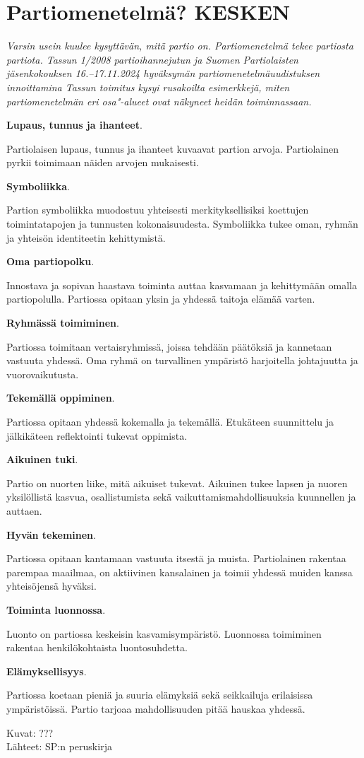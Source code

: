 \section{Partiomenetelmä? KESKEN}

\textit{Varsin usein kuulee kysyttävän, mitä partio on. Partiomenetelmä tekee partiosta partiota. Tassun 1/2008 partioihannejutun ja Suomen Partiolaisten jäsenkokouksen 16.--17.11.2024 hyväksymän partiomenetelmäuudistuksen innoittamina Tassun toimitus kysyi rusakoilta esimerkkejä, miten partiomenetelmän eri osa"-alueet ovat näkyneet heidän toiminnassaan.}

\begin{multicols}{2}
\noindent\textbf{Lupaus, tunnus ja ihanteet}. {\small Partiolaisen lupaus, tunnus ja ihanteet kuvaavat partion arvoja. Partiolainen pyrkii toimimaan näiden arvojen mukaisesti.\par}

\medskip\noindent\textbf{Symboliikka}. {\small Partion symboliikka muodostuu yhteisesti merkityksellisiksi koettujen toimintatapojen ja tunnusten kokonaisuudesta. Symboliikka tukee oman, ryhmän ja yhteisön identiteetin kehittymistä.\par}

\medskip\noindent\textbf{Oma partiopolku}. {\small Innostava ja sopivan haastava toiminta auttaa kasvamaan ja kehittymään omalla partiopolulla. Partiossa opitaan yksin ja yhdessä taitoja elämää varten.\par}

\medskip\noindent\textbf{Ryhmässä toimiminen}. {\small Partiossa toimitaan vertaisryhmissä, joissa tehdään päätöksiä ja kannetaan vastuuta yhdessä. Oma ryhmä on turvallinen ympäristö harjoitella johtajuutta ja vuorovaikutusta.\par}

\medskip\noindent\textbf{Tekemällä oppiminen}. {\small Partiossa opitaan yhdessä kokemalla ja tekemällä. Etukäteen suunnittelu ja jälkikäteen reflektointi tukevat oppimista.\par}

\medskip\noindent\textbf{Aikuinen tuki}. {\small Partio on nuorten liike, mitä aikuiset tukevat. Aikuinen tukee lapsen ja nuoren yksilöllistä kasvua, osallistumista sekä vaikuttamismahdollisuuksia kuunnellen ja auttaen.\par}

\medskip\noindent\textbf{Hyvän tekeminen}. {\small Partiossa opitaan kantamaan vastuuta itsestä ja muista. Partiolainen rakentaa parempaa maailmaa, on aktiivinen kansalainen ja toimii yhdessä muiden kanssa yhteisöjensä hyväksi.\par}

\medskip\noindent\textbf{Toiminta luonnossa}. {\small Luonto on partiossa keskeisin kasvamisympäristö. Luonnossa toimiminen rakentaa henkilökohtaista luontosuhdetta.\par}

\medskip\noindent\textbf{Elämyksellisyys}. {\small Partiossa koetaan pieniä ja suuria elämyksiä sekä seikkailuja erilaisissa ympäristöissä. Partio tarjoaa mahdollisuuden pitää hauskaa yhdessä.\par}
\end{multicols}

\medskip

\noindent\null\hfill Kuvat: ???\\
\noindent\null\hfill Lähteet: SP:n peruskirja
